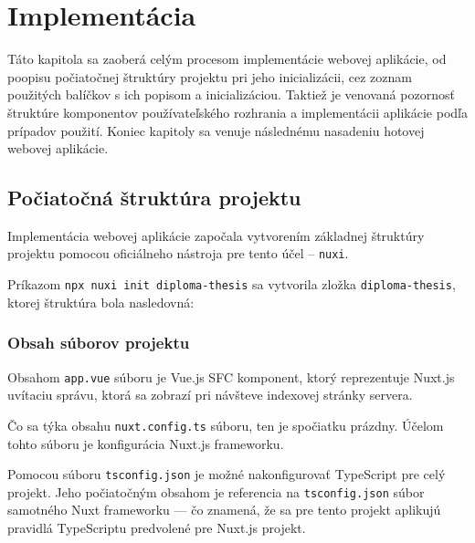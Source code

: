 \chapter {Implementácia}
Táto kapitola sa zaoberá celým procesom implementácie webovej aplikácie, od poopisu počiatočnej štruktúry projektu pri jeho inicializácii, cez zoznam použitých balíčkov s ich popisom a inicializáciou. Taktiež je venovaná pozornosť štruktúre komponentov používateľského rozhrania a implementácii aplikácie podľa prípadov použití. Koniec kapitoly sa venuje následnému nasadeniu hotovej webovej aplikácie.

\section {Počiatočná štruktúra projektu}
Implementácia webovej aplikácie započala vytvorením základnej štruktúry projektu pomocou oficiálneho nástroja pre tento účel -- \texttt{nuxi}.

Príkazom \texttt{npx nuxi init diploma-thesis} sa vytvorila zložka \texttt{diploma-thesis}, ktorej štruktúra bola nasledovná:

\begin{figure}[H]
\end{figure}

\subsection {Obsah súborov projektu}
Obsahom \texttt{app.vue} súboru je Vue.js SFC komponent, ktorý reprezentuje Nuxt.js uvítaciu správu, ktorá sa zobrazí pri návšteve indexovej stránky servera.

Čo sa týka obsahu \texttt{nuxt.config.ts} súboru, ten je spočiatku prázdny. Účelom tohto súboru je konfigurácia Nuxt.js frameworku.

Pomocou súboru \texttt{tsconfig.json} je možné nakonfigurovať TypeScript pre celý projekt. Jeho počiatočným obsahom je referencia na \texttt{tsconfig.json} súbor samotného Nuxt frameworku --- čo znamená, že sa pre tento projekt aplikujú pravidlá TypeScriptu predvolené pre Nuxt.js projekt.

